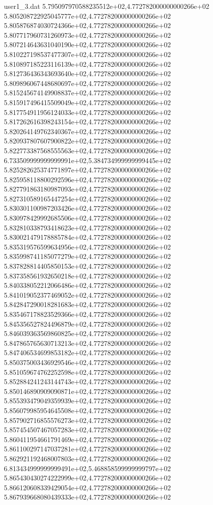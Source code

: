 \begin{filecontents}{user1_3.dat}
5.795097970588235512e+02,4.772782000000000266e+02
5.805208722925045777e+02,4.772782000000000266e+02
5.805876874030724366e+02,4.772782000000000266e+02
5.807717960731260973e+02,4.772782000000000266e+02
5.807214643631040190e+02,4.772782000000000266e+02
5.810227198537477307e+02,4.772782000000000266e+02
5.810897185223116139e+02,4.772782000000000266e+02
5.812736436343693640e+02,4.772782000000000266e+02
5.809896067448680697e+02,4.772782000000000266e+02
5.815245674149908837e+02,4.772782000000000266e+02
5.815917496415509049e+02,4.772782000000000266e+02
5.817754911956124033e+02,4.772782000000000266e+02
5.817262616398243154e+02,4.772782000000000266e+02
5.820264149762340367e+02,4.772782000000000266e+02
5.820937807607900822e+02,4.772782000000000266e+02
5.822773387568555563e+02,4.772782000000000266e+02
6.733509999999999991e+02,5.384734999999999445e+02
5.825282625374771897e+02,4.772782000000000266e+02
5.825958118800292596e+02,4.772782000000000266e+02
5.827791863180987093e+02,4.772782000000000266e+02
5.827310589165447254e+02,4.772782000000000266e+02
5.830301100987203426e+02,4.772782000000000266e+02
5.830978429992685506e+02,4.772782000000000266e+02
5.832810338793418623e+02,4.772782000000000266e+02
5.830021479178885784e+02,4.772782000000000266e+02
5.835319576599634956e+02,4.772782000000000266e+02
5.835998741185077279e+02,4.772782000000000266e+02
5.837828814405850153e+02,4.772782000000000266e+02
5.837358561932650218e+02,4.772782000000000266e+02
5.840338052212066486e+02,4.772782000000000266e+02
5.841019052377469052e+02,4.772782000000000266e+02
5.842847290018281683e+02,4.772782000000000266e+02
5.835467178823529366e+02,4.772782000000000266e+02
5.845356527824496879e+02,4.772782000000000266e+02
5.846039363569860825e+02,4.772782000000000266e+02
5.847865765630713213e+02,4.772782000000000266e+02
5.847406534699853182e+02,4.772782000000000266e+02
5.850375003436929546e+02,4.772782000000000266e+02
5.851059674762252598e+02,4.772782000000000266e+02
5.852884241243144743e+02,4.772782000000000266e+02
5.850146890909090871e+02,4.772782000000000266e+02
5.855393479049359939e+02,4.772782000000000266e+02
5.856079985954645508e+02,4.772782000000000266e+02
5.857902716855576273e+02,4.772782000000000266e+02
5.857454507467057283e+02,4.772782000000000266e+02
5.860411954661791469e+02,4.772782000000000266e+02
5.861100297147037281e+02,4.772782000000000266e+02
5.862921192468007803e+02,4.772782000000000266e+02
6.813434999999999491e+02,5.468858599999999797e+02
5.865430430274222999e+02,4.772782000000000266e+02
5.866120608339429054e+02,4.772782000000000266e+02
5.867939668080439333e+02,4.772782000000000266e+02

\end{filecontents}
